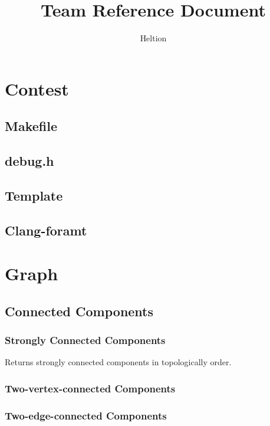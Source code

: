 \documentclass{article}
\begin{document}
\title{Team Reference Document}
\author{Heltion}
\maketitle
\newpage
\begin{multicols}{3}
    \tableofcontents
    \newpage
    \setcounter{page}{1}
    \footnotesize

    \section{Contest}
    \subsection{Makefile}
    
    \subsection{debug.h}
    
    \subsection{Template}
    
    \subsection{Clang-foramt}

    \section{Graph}
    \subsection{Connected Components}
    \subsubsection{Strongly Connected Components}
    Returns strongly connected components in topologically order.
    

    \subsubsection{Two-vertex-connected Components}
    

    \subsubsection{Two-edge-connected Components}
    


\end{multicols}
\end{document}
